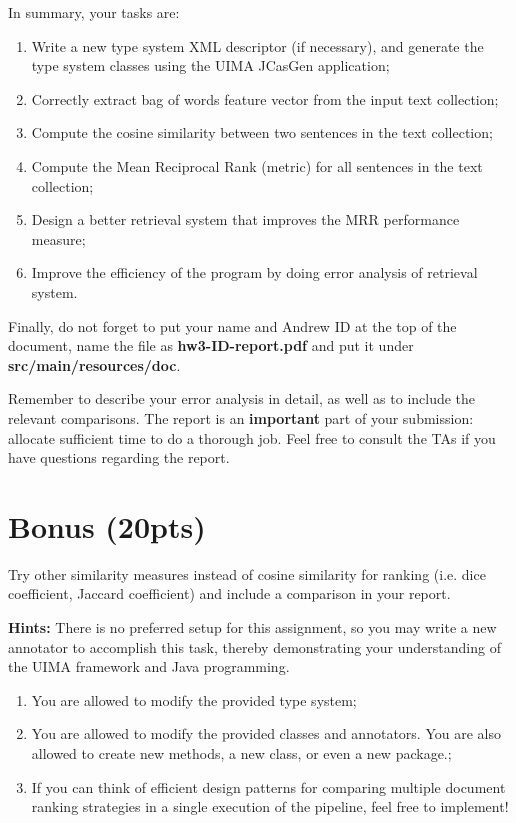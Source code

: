\documentclass[oneside,11pt]{memoir}
\begin{document}
In summary, your tasks are:
\begin{enumerate}
\item Write a new type system XML descriptor (if necessary),
and generate the type system classes using the UIMA JCasGen application;
\item Correctly extract bag of words feature vector from the input text collection;
\item Compute the cosine similarity between two sentences in the text collection;
\item Compute the Mean Reciprocal Rank (metric) for all sentences in the text collection;
\item Design a better retrieval system that improves the MRR performance measure;
\item Improve the efficiency of the program by doing error analysis of retrieval system.
\end{enumerate}

Finally, do not forget to put
your name and Andrew ID at the top of the document, 
name the file as \textbf{hw3-ID-report.pdf} and put it
under \textbf{src/main/resources/doc}. 

Remember to describe your error analysis in detail, 
as well as to include the relevant comparisons. 
The report is an \textbf{important} part of your submission: 
allocate sufficient time to do a thorough job. 
Feel free to consult the TAs if you have questions regarding the report.

\chapter*{Bonus (20pts)}

Try other similarity measures instead of cosine similarity for ranking (i.e. dice coefficient, Jaccard
coefficient) and include a comparison in your report.


\textbf{Hints:} There is no preferred setup for this assignment, so you may write a new annotator to accomplish this
task, thereby demonstrating your understanding of the UIMA framework and Java programming.

\begin{enumerate}
\item You are allowed to modify the provided type system;
\item You are allowed to modify the provided classes and annotators. You are also allowed to create new
methods, a new class, or even a new package.;
\item If you can think of efficient design patterns for comparing multiple document ranking strategies in a
single execution of the pipeline, feel free to implement!
\end{enumerate}
\end{document}
